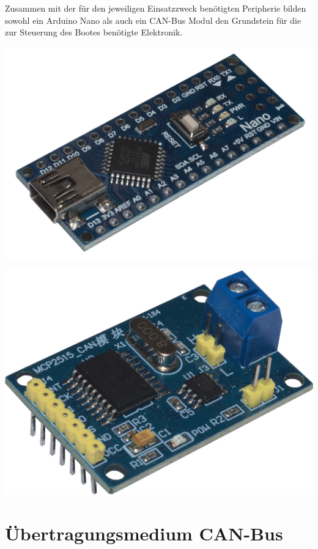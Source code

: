 Zusammen mit der für den jeweiligen Einsatzzweck benötigten Peripherie bilden sowohl ein Arduino Nano als auch ein CAN-Bus Modul den Grundstein für die zur Steuerung des Bootes benötigte Elektronik.\\

\begin{minipage}{7cm}
    \includegraphics[width=\textwidth]{Fotos/Arduino_Nano.png}
\end{minipage}
\begin{minipage}{7cm}
\includegraphics[width=\textwidth]{Fotos/CAN_BUS_Shield.png}
\end{minipage}
\section{Übertragungsmedium CAN-Bus}
